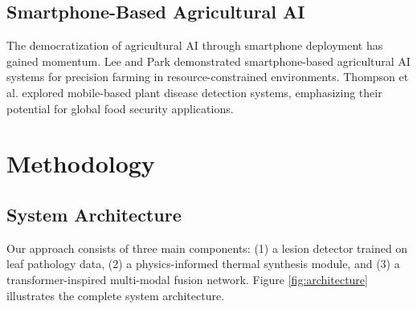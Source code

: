 \documentclass[conference]{IEEEtran}
\begin{document}
\subsection{Smartphone-Based Agricultural AI}

The democratization of agricultural AI through smartphone deployment has gained momentum. Lee and Park \cite{lee2022mobile} demonstrated smartphone-based agricultural AI systems for precision farming in resource-constrained environments. Thompson et al. \cite{thompson2023mobile} explored mobile-based plant disease detection systems, emphasizing their potential for global food security applications.

\section{Methodology}

\subsection{System Architecture}

Our approach consists of three main components: (1) a lesion detector trained on leaf pathology data, (2) a physics-informed thermal synthesis module, and (3) a transformer-inspired multi-modal fusion network. Figure \ref{fig:architecture} illustrates the complete system architecture.
\end{document}
